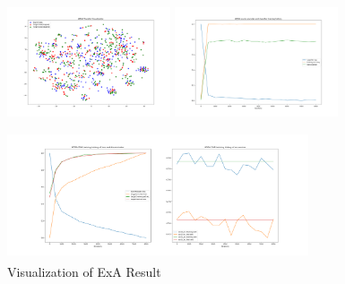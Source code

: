 \documentclass[conference]{IEEEtran}
\begin{document}
\begin{figure}[htb]
\label{fig:ExA}
\centering
\begin{minipage}[t]{0.3\textwidth}
\includegraphics[width=1.9in, height=1.5in]{Ladda/std_A2R/ADDA_visual.png}
\end{minipage}%
\begin{minipage}[t]{0.3\textwidth}
\includegraphics[width=1.9in, height=1.5in]{Ladda/std_A2R/clf.png}
\end{minipage}%
\begin{minipage}[t]{0.45\textwidth}
\includegraphics[width=3.5in, height=1.5in]{Ladda/std_A2R/gan.png}
\end{minipage}%
\caption{Visualization of ExA Result}
\end{figure}
\end{document}
